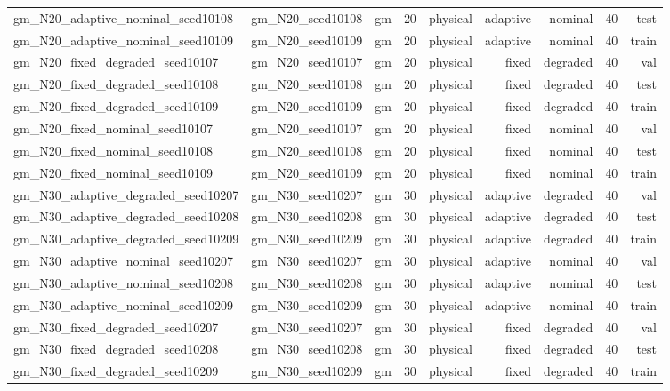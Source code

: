 \begin{tabular}{lrrrrrrrr}
gm\_N20\_adaptive\_nominal\_seed10108 & gm\_N20\_seed10108 & gm & 20 & physical & adaptive & nominal & 40 & test \\
gm\_N20\_adaptive\_nominal\_seed10109 & gm\_N20\_seed10109 & gm & 20 & physical & adaptive & nominal & 40 & train \\
gm\_N20\_fixed\_degraded\_seed10107 & gm\_N20\_seed10107 & gm & 20 & physical & fixed & degraded & 40 & val \\
gm\_N20\_fixed\_degraded\_seed10108 & gm\_N20\_seed10108 & gm & 20 & physical & fixed & degraded & 40 & test \\
gm\_N20\_fixed\_degraded\_seed10109 & gm\_N20\_seed10109 & gm & 20 & physical & fixed & degraded & 40 & train \\
gm\_N20\_fixed\_nominal\_seed10107 & gm\_N20\_seed10107 & gm & 20 & physical & fixed & nominal & 40 & val \\
gm\_N20\_fixed\_nominal\_seed10108 & gm\_N20\_seed10108 & gm & 20 & physical & fixed & nominal & 40 & test \\
gm\_N20\_fixed\_nominal\_seed10109 & gm\_N20\_seed10109 & gm & 20 & physical & fixed & nominal & 40 & train \\
gm\_N30\_adaptive\_degraded\_seed10207 & gm\_N30\_seed10207 & gm & 30 & physical & adaptive & degraded & 40 & val \\
gm\_N30\_adaptive\_degraded\_seed10208 & gm\_N30\_seed10208 & gm & 30 & physical & adaptive & degraded & 40 & test \\
gm\_N30\_adaptive\_degraded\_seed10209 & gm\_N30\_seed10209 & gm & 30 & physical & adaptive & degraded & 40 & train \\
gm\_N30\_adaptive\_nominal\_seed10207 & gm\_N30\_seed10207 & gm & 30 & physical & adaptive & nominal & 40 & val \\
gm\_N30\_adaptive\_nominal\_seed10208 & gm\_N30\_seed10208 & gm & 30 & physical & adaptive & nominal & 40 & test \\
gm\_N30\_adaptive\_nominal\_seed10209 & gm\_N30\_seed10209 & gm & 30 & physical & adaptive & nominal & 40 & train \\
gm\_N30\_fixed\_degraded\_seed10207 & gm\_N30\_seed10207 & gm & 30 & physical & fixed & degraded & 40 & val \\
gm\_N30\_fixed\_degraded\_seed10208 & gm\_N30\_seed10208 & gm & 30 & physical & fixed & degraded & 40 & test \\
gm\_N30\_fixed\_degraded\_seed10209 & gm\_N30\_seed10209 & gm & 30 & physical & fixed & degraded & 40 & train \\

\end{tabular}
